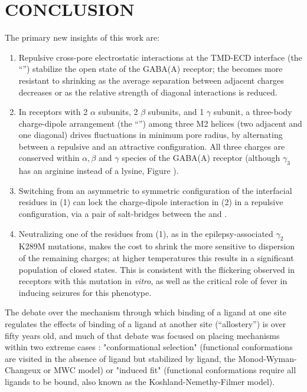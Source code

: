 \documentclass[9pt,twocolumn,twoside,lineno]{pnas-new}
\begin{document}
\section*{CONCLUSION}
The primary new insights of this work are:  
\begin{enumerate}
\item Repulsive cross-pore electrostatic interactions at the TMD-ECD interface (the ``\fiveringnos'') stabilize the open state of the GABA(A) receptor; the \fivering becomes more resistant to shrinking as the average separation between adjacent charges decreases or as the relative strength of diagonal interactions is reduced. 
\item In \GABAA receptors with 2 $\alpha$ subunits, 2 $\beta$ subunits, and 1 $\gamma$ subunit, a three-body charge-dipole arrangement (the ``\triadns'') among three M2 helices (two adjacent and one diagonal) %
drives fluctuations in minimum pore radius, by alternating between a repulsive and an attractive configuration.  All three charges are conserved within $\alpha, \beta$ and $\gamma$ species of the GABA(A) receptor (although $\gamma_3$ has an arginine instead of a lysine, Figure \sfigAlignment).
\item Switching from an asymmetric to symmetric configuration of the interfacial residues in (1) can lock the charge-dipole interaction in (2) in a repulsive configuration, via a pair of salt-bridges between the \triad and \fiveringnos.   
\item Neutralizing one of the residues from (1), as in the epilepsy-associated $\gamma_{2}$K289M mutations, makes the cost to shrink the \fivering more sensitive to dispersion of the remaining charges; at higher temperatures this results in a significant population of closed states.  This is consistent with the flickering observed in receptors with this mutation in {\it vitro}, as well as the critical role of fever in inducing seizures for this phenotype. 
\end{enumerate}

The debate over the mechanism through which binding of a ligand at one site regulates the effects of binding of a ligand at another site (``allostery'') is over fifty years old,\cite{Changeux2011,Changeux2016} %
 and much of that debate was focused on placing mechanisms within two extreme cases :  "conformational selection" (functional conformations are visited in the absence of ligand but stabilized by ligand, the Monod-Wyman-Changeux or MWC model)  or "induced fit"   (functional conformations require all ligands to be bound, also known as the Koshland-Nemethy-Filmer model).  
 
\end{document}
